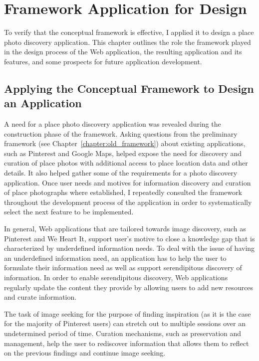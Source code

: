 \chapter{Framework Application for Design}
\label{chapter:application}

To verify that the conceptual framework is effective, I applied it to design a place photo discovery application. This chapter outlines the role the framework played in the design process of the Web application, the resulting application and its features, and some prospects for future application development. 

{\section{Applying the Conceptual Framework to Design an Application}
A need for a place photo discovery application was revealed during the construction phase of the framework. Asking questions from the preliminary framework (see Chapter~\ref{chapter:old_framework}) about existing applications, such as Pinterest and Google Maps, helped expose the need for discovery and curation of place photos with additional access to place location data and other details. It also helped gather some of the requirements for a photo discovery application. Once user needs and motives for information discovery and curation of place photographs where established, I repeatedly consulted the framework throughout the development process of the application in order to systematically select the next feature to be implemented.

In general, Web applications that are tailored towards image discovery, such as Pinterest and We Heart It, support user's motive to close a knowledge gap that is characterized by underdefined information needs. To deal with the issue of having an underdefined information need, an application has to help the user to formulate their information need as well as support serendipitous discovery of information. In order to enable serendipitous discovery, Web applications regularly update the content they provide by allowing users to add new resources and curate information. 

The task of image seeking for the purpose of finding inspiration (as it is the case for the majority of Pinterest users) can stretch out to multiple sessions over an undetermined period of time. Curation mechanisms, such as preservation and management, help the user to rediscover information that allows them to reflect on the previous findings and continue image seeking.  

}
